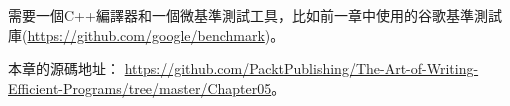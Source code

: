 需要一個C++編譯器和一個微基準測試工具，比如前一章中使用的谷歌基準測試庫(\url{https://github.com/google/benchmark})。

本章的源碼地址： \url{https://github.com/PacktPublishing/The-Art-of-Writing-Efficient-Programs/tree/master/Chapter05}。